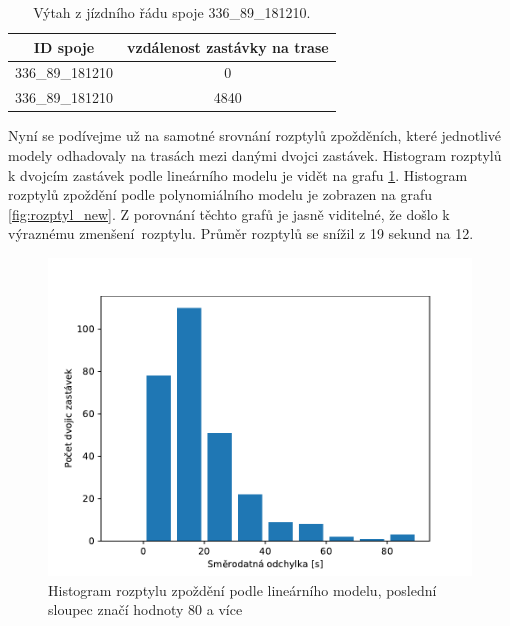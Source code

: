 \begin{center}
	\begin{table}[ht]
\centering
\begin{tabular}{|c|c|}
\hline
ID spoje & vzdálenost zastávky na trase \\ \hline \hline
336\_89\_181210 & 0 \\ \hline
336\_89\_181210 & 4840 \\ \hline
\end{tabular}
\label{tab:9270_ride}
\caption{Výtah z jízdního řádu spoje 336\_89\_181210.}
\end{table}
\end{center}

\bigbreak

Nyní se podívejme už na samotné srovnání rozptylů zpožděních, které jednotlivé modely odhadovaly na trasách mezi danými dvojci zastávek. Histogram rozptylů k dvojcím zastávek podle lineárního modelu je vidět na grafu \ref{fig:rozptyl_old}. Histogram rozptylů zpoždění podle polynomiálního modelu je zobrazen na grafu \ref{fig:rozptyl_new}. Z porovnání těchto grafů je jasně viditelné, že došlo k výraznému zmenšení rozptylu. Průměr rozptylů se snížil z 19 sekund na 12.

\begin{figure}
	\centering
  \includegraphics[width=1\linewidth]{../img/rozptyl_old}
  \caption{Histogram rozptylu zpoždění podle lineárního modelu, poslední sloupec značí hodnoty 80 a více}
  \label{fig:rozptyl_old}
\end{figure}

